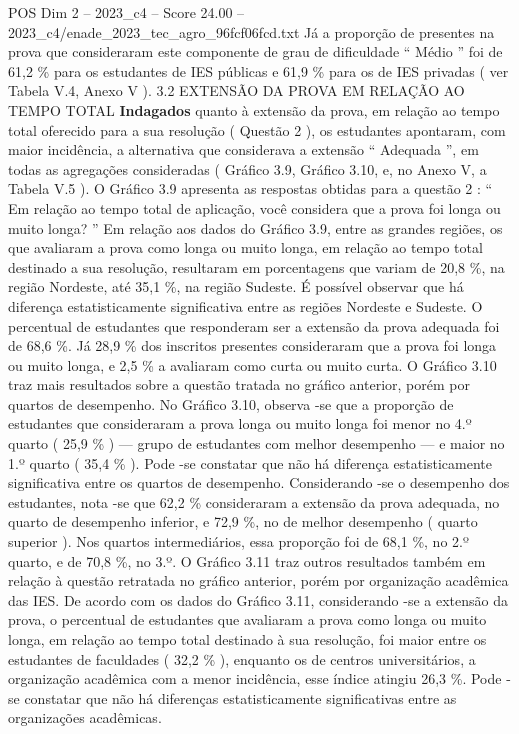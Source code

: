 \begin{textsample}{POS Dim 2 – 2023\_c4 – Score 24.00 – 2023\_c4/enade\_2023\_tec\_agro\_96fcf06fcd.txt}
Já a proporção de presentes na prova que consideraram este componente de grau de dificuldade “ Médio ” foi de 61,2 \% para os estudantes de IES públicas e 61,9 \% para os de IES privadas ( ver Tabela V.4, Anexo V ). 3.2 EXTENSÃO DA PROVA EM RELAÇÃO AO TEMPO TOTAL \textbf{Indagados} quanto à extensão da prova, em relação ao tempo total oferecido para a sua resolução ( Questão 2 ), os estudantes apontaram, com maior incidência, a alternativa que considerava a extensão “ Adequada ”, em todas as agregações consideradas ( Gráfico 3.9, Gráfico 3.10, e, no Anexo V, a Tabela V.5 ).
O Gráfico 3.9 apresenta as respostas obtidas para a questão 2 : “ Em relação ao tempo total de aplicação, você considera que a prova foi longa ou muito longa? ” Em relação aos dados do Gráfico 3.9, entre as grandes regiões, os que avaliaram a prova como longa ou muito longa, em relação ao tempo total destinado a sua resolução, resultaram em porcentagens que variam de 20,8 \%, na região Nordeste, até 35,1 \%, na região Sudeste.
É possível observar que há diferença estatisticamente significativa entre as regiões Nordeste e Sudeste.
O percentual de estudantes que responderam ser a extensão da prova adequada foi de 68,6 \%.
Já 28,9 \% dos inscritos presentes consideraram que a prova foi longa ou muito longa, e 2,5 \% a avaliaram como curta ou muito curta.
O Gráfico 3.10 traz mais resultados sobre a questão tratada no gráfico anterior, porém por quartos de desempenho.
No Gráfico 3.10, observa -se que a proporção de estudantes que consideraram a prova longa ou muito longa foi menor no 4.º quarto ( 25,9 \% ) — grupo de estudantes com melhor desempenho — e maior no 1.º quarto ( 35,4 \% ).
Pode -se constatar que não há diferença estatisticamente significativa entre os quartos de desempenho.
Considerando -se o desempenho dos estudantes, nota -se que 62,2 \% consideraram a extensão da prova adequada, no quarto de desempenho inferior, e 72,9 \%, no de melhor desempenho ( quarto superior ).
Nos quartos intermediários, essa proporção foi de 68,1 \%, no 2.º quarto, e de 70,8 \%, no 3.º.
O Gráfico 3.11 traz outros resultados também em relação à questão retratada no gráfico anterior, porém por organização acadêmica das IES.
De acordo com os dados do Gráfico 3.11, considerando -se a extensão da prova, o percentual de estudantes que avaliaram a prova como longa ou muito longa, em relação ao tempo total destinado à sua resolução, foi maior entre os estudantes de faculdades ( 32,2 \% ), enquanto os de centros universitários, a organização acadêmica com a menor incidência, esse índice atingiu 26,3 \%.
Pode -se constatar que não há diferenças estatisticamente significativas entre as organizações acadêmicas.

\end{textsample}
